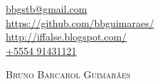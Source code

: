 \begin{flushright}
    \href{mailto:bbgstb@gmail.com}{bbgstb@gmail.com} \\
    \href{https://github.com/bbguimaraes/}{https://github.com/bbguimaraes/} \\
    \href{http://iffalse.blogspot.com/}{http://iffalse.blogspot.com/} \\
    \href{tel:+5554 91431121}{+5554 91431121} \\
\end{flushright}
\vspace{5mm}
\textsc{\Huge Bruno Barcarol Guimarães} \\\\\\\\\\\\
